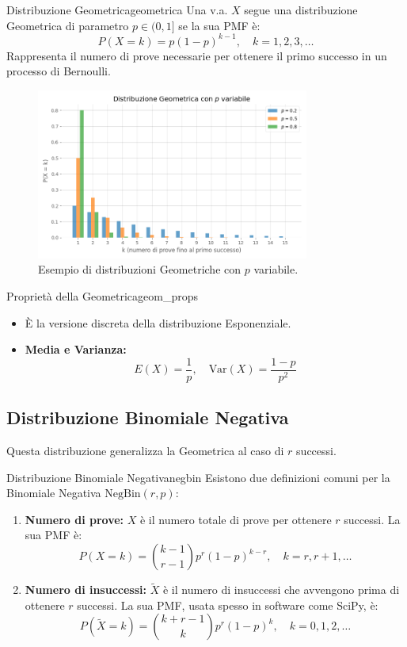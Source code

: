 \begin{definizione}{Distribuzione Geometrica}{geometrica}
Una v.a. \(X\) segue una distribuzione Geometrica di parametro \(p \in (0,1]\) se la sua PMF è:
\[
P(X=k) = p(1-p)^{k-1}, \quad k=1, 2, 3, \dots
\]
Rappresenta il numero di prove necessarie per ottenere il primo successo in un processo di Bernoulli.
\end{definizione}

\begin{figure}[H]
    \centering
    \includegraphics[width=0.8\textwidth]{images/th_01_03/geometrica.png}
    \caption{Esempio di distribuzioni Geometriche con \(p\) variabile.}
    \label{fig:geometrica}
\end{figure}

\begin{proposizione}{Proprietà della Geometrica}{geom_props}
\begin{itemize}
    \item È la versione discreta della distribuzione Esponenziale.
    \item \textbf{Media e Varianza:}
    \[ E(X) = \frac{1}{p}, \quad \text{Var}(X) = \frac{1-p}{p^2} \]
\end{itemize}
\end{proposizione}

\subsection{Distribuzione Binomiale Negativa}
Questa distribuzione generalizza la Geometrica al caso di \(r\) successi.

\begin{definizione}{Distribuzione Binomiale Negativa}{negbin}
Esistono due definizioni comuni per la Binomiale Negativa \(\text{NegBin}(r,p)\):
\begin{enumerate}
    \item \textbf{Numero di prove:} \(X\) è il numero totale di prove per ottenere \(r\) successi. La sua PMF è:
    \[ P(X=k) = \binom{k-1}{r-1}p^r(1-p)^{k-r}, \quad k=r, r+1, \dots \]
    \item \textbf{Numero di insuccessi:} \(\tilde{X}\) è il numero di insuccessi che avvengono prima di ottenere \(r\) successi. La sua PMF, usata spesso in software come SciPy, è:
    \[ P(\tilde{X}=k) = \binom{k+r-1}{k}p^r(1-p)^{k}, \quad k=0, 1, 2, \dots \]
\end{enumerate}
\end{definizione}

